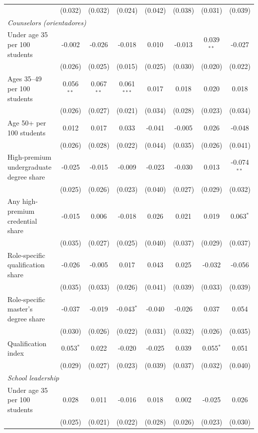 \begin{table}[!htbp]
{\begin{tabular}{lccccccc}
 & (0.032) & (0.032) & (0.024) & (0.042) & (0.038) & (0.031) & (0.039) \\
\multicolumn{8}{l}{\textit{Counselors (orientadores)}} \\
\quad Under age 35 per 100 students & -0.002 & -0.026 & -0.018 & 0.010 & -0.013 & 0.039$^{**}$ & -0.027 \\
 & (0.026) & (0.025) & (0.015) & (0.025) & (0.030) & (0.020) & (0.022) \\
\quad Ages 35--49 per 100 students & 0.056$^{**}$ & 0.067$^{**}$ & 0.061$^{***}$ & 0.017 & 0.018 & 0.020 & 0.018 \\
 & (0.026) & (0.027) & (0.021) & (0.034) & (0.028) & (0.023) & (0.034) \\
\quad Age 50+ per 100 students & 0.012 & 0.017 & 0.033 & -0.041 & -0.005 & 0.026 & -0.048 \\
 & (0.026) & (0.028) & (0.022) & (0.044) & (0.035) & (0.026) & (0.041) \\
\quad High-premium undergraduate degree share & -0.025 & -0.015 & -0.009 & -0.023 & -0.030 & 0.013 & -0.074$^{**}$ \\
 & (0.025) & (0.026) & (0.023) & (0.040) & (0.027) & (0.029) & (0.032) \\
\quad Any high-premium credential share & -0.015 & 0.006 & -0.018 & 0.026 & 0.021 & 0.019 & 0.063$^{*}$ \\
 & (0.035) & (0.027) & (0.025) & (0.040) & (0.037) & (0.029) & (0.037) \\
\quad Role-specific qualification share & -0.026 & -0.005 & 0.017 & 0.043 & 0.025 & -0.032 & -0.056 \\
 & (0.035) & (0.033) & (0.026) & (0.041) & (0.039) & (0.033) & (0.039) \\
\quad Role-specific master's degree share & -0.037 & -0.019 & -0.043$^{*}$ & -0.040 & -0.026 & 0.037 & 0.054 \\
 & (0.030) & (0.026) & (0.022) & (0.031) & (0.032) & (0.026) & (0.035) \\
\quad Qualification index & 0.053$^{*}$ & 0.022 & -0.020 & -0.025 & 0.039 & 0.055$^{*}$ & 0.051 \\
 & (0.029) & (0.027) & (0.023) & (0.039) & (0.037) & (0.032) & (0.040) \\
\multicolumn{8}{l}{\textit{School leadership}} \\
\quad Under age 35 per 100 students & 0.028 & 0.011 & -0.016 & 0.018 & 0.002 & -0.025 & 0.026 \\
 & (0.025) & (0.021) & (0.022) & (0.028) & (0.026) & (0.023) & (0.030) \\

\end{tabular}}
\end{table}
